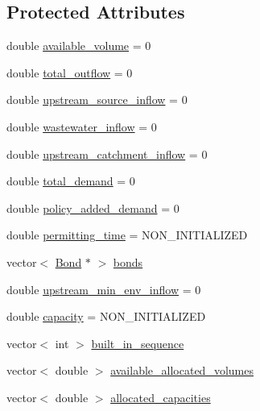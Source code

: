 \subsection*{Protected Attributes}
\begin{DoxyCompactItemize}
\item 
double \mbox{\hyperlink{classWaterSource_a49e1a191152e344e2161e8db166e067a}{available\+\_\+volume}} = 0
\item 
double \mbox{\hyperlink{classWaterSource_a5e6992931464ed75576326b9f1bd3c4f}{total\+\_\+outflow}} = 0
\item 
double \mbox{\hyperlink{classWaterSource_a7a69b2e9b6030f1035e6cf44d2918ee5}{upstream\+\_\+source\+\_\+inflow}} = 0
\item 
double \mbox{\hyperlink{classWaterSource_aeb5a2d2d83383a70ca20f3e94635a9c7}{wastewater\+\_\+inflow}} = 0
\item 
double \mbox{\hyperlink{classWaterSource_aceb2d77612db7ba71a171848a5e03b4f}{upstream\+\_\+catchment\+\_\+inflow}} = 0
\item 
double \mbox{\hyperlink{classWaterSource_a1934917dd35a2508a5102eb5831431b7}{total\+\_\+demand}} = 0
\item 
double \mbox{\hyperlink{classWaterSource_a3f04ae75d6235117d391dece2d323890}{policy\+\_\+added\+\_\+demand}} = 0
\item 
double \mbox{\hyperlink{classWaterSource_a036d7980e74224fd5f5c6a390e0d5abb}{permitting\+\_\+time}} = N\+O\+N\+\_\+\+I\+N\+I\+T\+I\+A\+L\+I\+Z\+ED
\item 
vector$<$ \mbox{\hyperlink{classBond}{Bond}} $\ast$ $>$ \mbox{\hyperlink{classWaterSource_a413b094e11bdce62f4d82e5bb9e4706e}{bonds}}
\item 
double \mbox{\hyperlink{classWaterSource_a67165e29345b61f36c8d8ccf3f648819}{upstream\+\_\+min\+\_\+env\+\_\+inflow}} = 0
\item 
double \mbox{\hyperlink{classWaterSource_a2ec257b415b248214a8bce7fc5267723}{capacity}} = N\+O\+N\+\_\+\+I\+N\+I\+T\+I\+A\+L\+I\+Z\+ED
\item 
vector$<$ int $>$ \mbox{\hyperlink{classWaterSource_a49f9da70a5080abe82160b1a0d194e60}{built\+\_\+in\+\_\+sequence}}
\item 
vector$<$ double $>$ \mbox{\hyperlink{classWaterSource_a77d3fe9ea445fc987b07debdfb9e2f5b}{available\+\_\+allocated\+\_\+volumes}}
\item 
vector$<$ double $>$ \mbox{\hyperlink{classWaterSource_ab94063d51314cfb896010408ae32fa9c}{allocated\+\_\+capacities}}
\item 

\end{DoxyCompactItemize}
